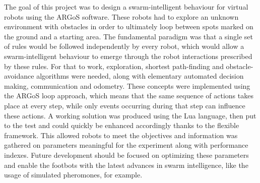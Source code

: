 The goal of this project was to design a swarm-intelligent behaviour for virtual robots using the ARGoS software. These robots had to explore an unknown environment with obstacles in order to ultimately loop between spots marked on the ground and a starting area. The fundamental paradigm was that a single set of rules would be followed independently by every robot, which would allow a swarm-intelligent behaviour to emerge through the robot interactions prescribed by these rules. For that to work, exploration, shortest path-finding and obstacle-avoidance algorithms were needed, along with elementary automated decision making, communication and odometry. These concepts were implemented using the ARGoS loop approach, which means that the same sequence of actions takes place at every step, while only events occurring during that step can influence these actions. A working solution was produced using the Lua language, then put to the test and could quickly be enhanced accordingly thanks to the flexible framework. This allowed robots to meet the objectives and information was gathered on parameters meaningful for the experiment along with performance indexes. Future development should be focused on optimizing these parameters and enable the footbots with the latest advances in swarm intelligence, like the usage of simulated pheromones, for example.
